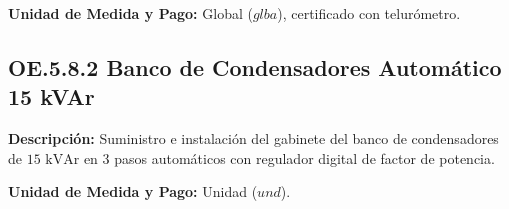 \textbf{Unidad de Medida y Pago:} Global ($glba$), certificado con telurómetro.

\subsection{OE.5.8.2 Banco de Condensadores Automático 15 kVAr}
\textbf{Descripción:} Suministro e instalación del gabinete del banco de condensadores de $15\text{ kVAr}$ en 3 pasos automáticos con regulador digital de factor de potencia.

\textbf{Unidad de Medida y Pago:} Unidad ($und$).

